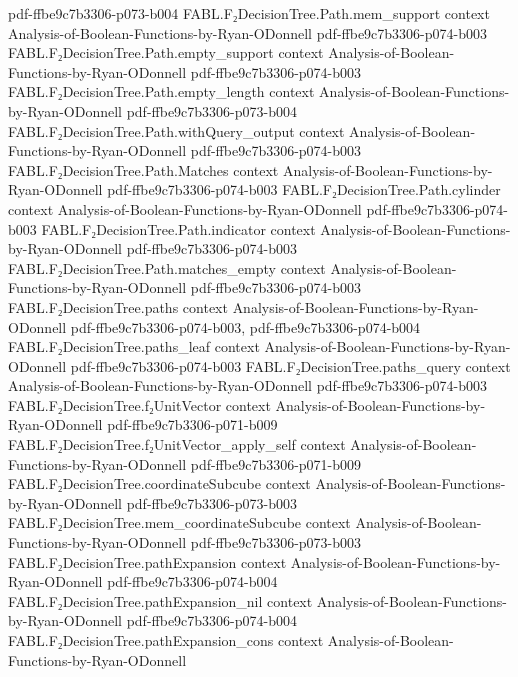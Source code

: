 \begin{theorem}
  {pdf-ffbe9c7b3306-p073-b004}
\proofstep
  {FABL.F₂DecisionTree.Path.mem_support}
  {context}
  {Analysis-of-Boolean-Functions-by-Ryan-ODonnell}
  {pdf-ffbe9c7b3306-p074-b003}
\proofstep
  {FABL.F₂DecisionTree.Path.empty_support}
  {context}
  {Analysis-of-Boolean-Functions-by-Ryan-ODonnell}
  {pdf-ffbe9c7b3306-p074-b003}
\proofstep
  {FABL.F₂DecisionTree.Path.empty_length}
  {context}
  {Analysis-of-Boolean-Functions-by-Ryan-ODonnell}
  {pdf-ffbe9c7b3306-p073-b004}
\proofstep
  {FABL.F₂DecisionTree.Path.withQuery_output}
  {context}
  {Analysis-of-Boolean-Functions-by-Ryan-ODonnell}
  {pdf-ffbe9c7b3306-p074-b003}
\proofstep
  {FABL.F₂DecisionTree.Path.Matches}
  {context}
  {Analysis-of-Boolean-Functions-by-Ryan-ODonnell}
  {pdf-ffbe9c7b3306-p074-b003}
\proofstep
  {FABL.F₂DecisionTree.Path.cylinder}
  {context}
  {Analysis-of-Boolean-Functions-by-Ryan-ODonnell}
  {pdf-ffbe9c7b3306-p074-b003}
\proofstep
  {FABL.F₂DecisionTree.Path.indicator}
  {context}
  {Analysis-of-Boolean-Functions-by-Ryan-ODonnell}
  {pdf-ffbe9c7b3306-p074-b003}
\proofstep
  {FABL.F₂DecisionTree.Path.matches_empty}
  {context}
  {Analysis-of-Boolean-Functions-by-Ryan-ODonnell}
  {pdf-ffbe9c7b3306-p074-b003}
\proofstep
  {FABL.F₂DecisionTree.paths}
  {context}
  {Analysis-of-Boolean-Functions-by-Ryan-ODonnell}
  {pdf-ffbe9c7b3306-p074-b003,
    pdf-ffbe9c7b3306-p074-b004}
\proofstep
  {FABL.F₂DecisionTree.paths_leaf}
  {context}
  {Analysis-of-Boolean-Functions-by-Ryan-ODonnell}
  {pdf-ffbe9c7b3306-p074-b003}
\proofstep
  {FABL.F₂DecisionTree.paths_query}
  {context}
  {Analysis-of-Boolean-Functions-by-Ryan-ODonnell}
  {pdf-ffbe9c7b3306-p074-b003}
\proofstep
  {FABL.F₂DecisionTree.f₂UnitVector}
  {context}
  {Analysis-of-Boolean-Functions-by-Ryan-ODonnell}
  {pdf-ffbe9c7b3306-p071-b009}
\proofstep
  {FABL.F₂DecisionTree.f₂UnitVector_apply_self}
  {context}
  {Analysis-of-Boolean-Functions-by-Ryan-ODonnell}
  {pdf-ffbe9c7b3306-p071-b009}
\proofstep
  {FABL.F₂DecisionTree.coordinateSubcube}
  {context}
  {Analysis-of-Boolean-Functions-by-Ryan-ODonnell}
  {pdf-ffbe9c7b3306-p073-b003}
\proofstep
  {FABL.F₂DecisionTree.mem_coordinateSubcube}
  {context}
  {Analysis-of-Boolean-Functions-by-Ryan-ODonnell}
  {pdf-ffbe9c7b3306-p073-b003}
\proofstep
  {FABL.F₂DecisionTree.pathExpansion}
  {context}
  {Analysis-of-Boolean-Functions-by-Ryan-ODonnell}
  {pdf-ffbe9c7b3306-p074-b004}
\proofstep
  {FABL.F₂DecisionTree.pathExpansion_nil}
  {context}
  {Analysis-of-Boolean-Functions-by-Ryan-ODonnell}
  {pdf-ffbe9c7b3306-p074-b004}
\proofstep
  {FABL.F₂DecisionTree.pathExpansion_cons}
  {context}
  {Analysis-of-Boolean-Functions-by-Ryan-ODonnell}

\end{theorem}
